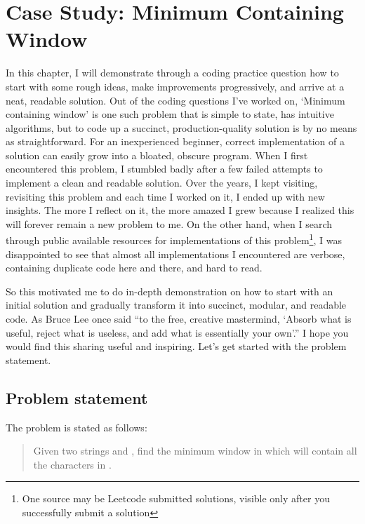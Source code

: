
\chapter{Case Study: Minimum Containing Window}\label{ch:minimumContainingWindow}

In this chapter, I will demonstrate through a coding practice question
how to start with some rough ideas, make improvements progressively, and arrive at a neat, readable
solution.
Out of the coding questions I've worked on, `Minimum containing window' is one such problem
that is simple to state, has intuitive algorithms, but
to code up a succinct, production-quality solution is by no means as straightforward.
For an inexperienced beginner, correct implementation of a solution can easily grow into a bloated,
obscure program.
When I first encountered this problem, I stumbled badly after a few failed attempts to
implement a clean and readable solution.
Over the years, I kept visiting, revisiting this problem and each time I worked on it, I ended up
with new insights.
The more I reflect on it, the more amazed I grew because I realized this will forever remain a
new problem to me.
On the other hand, when I search through public available resources for implementations of this
problem\footnote{One source may be Leetcode submitted solutions, visible only after you
successfully submit a solution}, I was disappointed to see that almost all
implementations I encountered are verbose, containing duplicate code here and there, and hard to
read.

So this motivated me to do in-depth demonstration on how to start with an initial solution and
gradually transform it into succinct, modular, and readable code.
As Bruce Lee once said ``to the free, creative mastermind, `Absorb what is useful, reject what is
useless, and add what is essentially your own'.''
I hope you would find this sharing useful and inspiring.
Let's get started with the problem statement.

\section{Problem statement}\label{sec:problemStatement.min-window}

The problem is stated as follows:
\begin{quote}
    Given two strings  and , find the minimum window in 
    which will contain all the characters in .
\end{quote}


